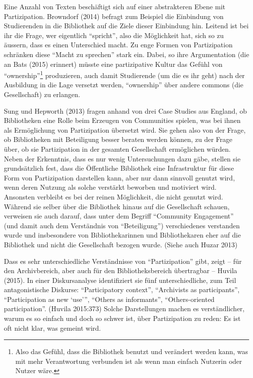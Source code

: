 \documentclass[a4paper,
fontsize=11pt,
oneside,
numbers=noperiodatend,
parskip=half-,
bibliography=totoc,
final
]{scrartcl}
\begin{document}
Eine Anzahl von Texten beschäftigt sich auf einer abstrakteren Ebene mit
Partizipation. Browndorf (2014) befragt zum Beispiel die Einbindung von
Studierenden in die Bibliothek auf die Ziele dieser Einbindung hin.
Leitend ist bei ihr die Frage, wer eigentlich \enquote{spricht}, also
die Möglichkeit hat, sich so zu äussern, dass es einen Unterschied
macht. Zu enge Formen von Partizipation schränken diese \enquote{Macht
zu sprechen} stark ein. Dabei, so ihre Argumentation (die an Bats (2015)
erinnert) müsste eine partizipative Kultur das Gefühl von
\enquote{ownership}\footnote{Also das Gefühl, dass die Bibliothek
  benutzt und verändert werden kann, was mit mehr Verantwortung
  verbunden ist als wenn man einfach Nutzerin oder Nutzer wäre.}
produzieren, auch damit Studierende (um die es ihr geht) nach der
Ausbildung in die Lage versetzt werden, \enquote{ownership} über andere
commons (die Gesellschaft) zu erlangen.

Sung und Hepworth (2013) fragen anhand von drei Case Studies aus
England, ob Bibliotheken eine Rolle beim Erzeugen von Communities
spielen, was bei ihnen als Ermöglichung von Partizipation übersetzt
wird. Sie gehen also von der Frage, ob Bibliotheken mit Beteiligung
besser beraten werden können, zu der Frage über, ob sie Partizipation in
der gesamten Gesellschaft ermöglichen würden. Neben der Erkenntnis, dass
es nur wenig Untersuchungen dazu gäbe, stellen sie grundsätzlich fest,
dass die Öffentliche Bibliothek eine Infrastruktur für diese Form von
Partizipation darstellen kann, aber nur dann sinnvoll genutzt wird, wenn
deren Nutzung als solche verstärkt beworben und motiviert wird.
Ansonsten verbleibt es bei der reinen Möglichkeit, die nicht genutzt
wird. Während sie selber über die Bibliothek hinaus auf die Gesellschaft
schauen, verweisen sie auch darauf, dass unter dem Begriff
\enquote{Community Engagement} (und damit auch dem Verständnis von
\enquote{Beteiligung}) verschiedenes verstanden wurde und insbesondere
von Bibliothekarinnen und Bibliothekaren eher auf die Bibliothek und
nicht die Gesellschaft bezogen wurde. (Siehe auch Huzar 2013)

Dass es sehr unterschiedliche Verständnisse von \enquote{Partizipation}
gibt, zeigt -- für den Archivbereich, aber auch für den
Bibliotheksbereich übertragbar -- Huvila (2015). In einer Diskursanalyse
identifiziert sie fünf unterschiedliche, zum Teil antagonistische
Diskurse: \enquote{Participatory context}, \enquote{Archivists as
participants}, \enquote{Participation as new \enquote{use}},
\enquote{Others as informants}, \enquote{Others-oriented participation}.
(Huvila 2015:373) Solche Darstellungen machen es verständlicher, warum
es so einfach und doch so schwer ist, über Partizipation zu reden: Es
ist oft nicht klar, was gemeint wird.
\end{document}
